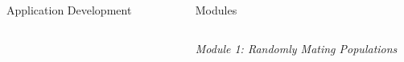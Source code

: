 \documentclass[final]{beamer}
\newlength{\sepwid}
\newlength{\onecolwid}
\newlength{\twocolwid}
\begin{document}
\begin{frame}[t]
\begin{columns}[t]
\begin{column}{\onecolwid}
\begin{block}{Application Development}
\vspace{1cm}




\end{block}



\end{column} %

\begin{column}{\sepwid}\end{column} %

\begin{column}{\twocolwid} %


%


\begin{block}{Modules}

\begin{columns}[t,totalwidth=\twocolwid] %


\begin{column}{\onecolwid} %



\textit{Module 1: Randomly Mating Populations}

\vspace{0.5cm}

\begin{center}
\begin{figure}
\end{figure}
\end{center}


\end{column}
\end{columns}
\end{block}
\end{column}
\end{columns}
\end{frame}
\end{document}

